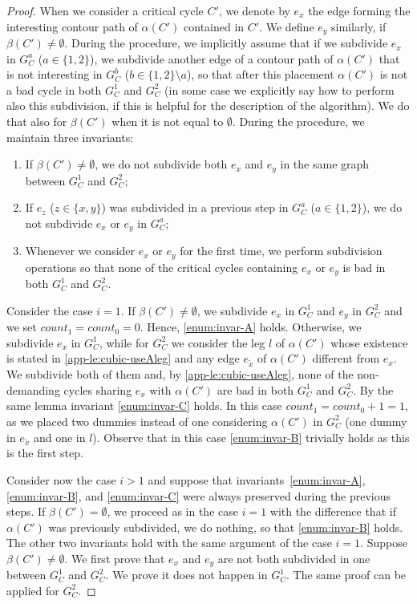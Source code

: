 \documentclass[runningheads]{llncs}
\begin{document}
\begin{proof}
 When we consider a critical cycle $C'$, we denote by $e_x$ the edge forming the interesting contour path of $\alpha(C')$ contained in $C'$. We define $e_y$ similarly, if $\beta(C')\not = \emptyset$. During the procedure, we implicitly assume that if we subdivide $e_x$ in $G^a_C$ ($a\in \{1,2\}$), we subdivide another edge of a contour path of $\alpha(C')$ that is not interesting in $G^b_C$ ($b\in \{1,2\}\setminus a$), so that after this placement $\alpha(C')$ is not a bad cycle in both $G^1_C$ and $G^2_C$ (in some case we explicitly say how to perform also this subdivision, if this is helpful for the description of the algorithm). We do that also for $\beta(C')$ when it is not equal to $\emptyset$. During the procedure, we maintain three invariants:
\begin{enumerate}[({I}1)] 
\item \label{enum:invar-A} 
If $\beta(C')\not = \emptyset$, we do not subdivide both $e_x$ and $e_y$ in the same graph between $G^1_C$ and $G^2_C$;
\item \label{enum:invar-B} 
If $e_z$ ($z\in \{x,y\}$) was subdivided in a previous step in $G^a_C$ ($a\in \{1,2\}$), we do not subdivide $e_x$ or $e_y$ in $G^a_C$;
\item \label{enum:invar-C}
Whenever we consider $e_x$ or $e_y$ for the first time, we perform subdivision operations so that none of the critical cycles containing $e_x$ or $e_y$ is bad in both $G^1_C$ and $G^2_C$.
\end{enumerate}
Consider the case $i=1$. If $\beta(C')\not = \emptyset$, we subdivide $e_x$ in $G^1_C$ and $e_y$ in $G^2_C$ and we set $count_1=count_0=0$. Hence, \ref{enum:invar-A} holds. Otherwise, we subdivide $e_x$ in $G^1_C$, while for $G^2_C$ we consider the leg $l$ of $\alpha(C')$ whose existence is stated in \cref{app-le:cubic-useAleg} and any edge $e_{\tilde x}$ of $\alpha(C')$ different from $e_x$. We subdivide both of them and, by \cref{app-le:cubic-useAleg}, none of the non-demanding cycles sharing $e_x$ with $\alpha(C')$ are bad in both $G^1_C$ and $G^2_C$. By the same lemma invariant  \ref{enum:invar-C} holds. In this case $count_1=count_0+1=1$, as we placed two dummies instead of one considering $\alpha(C')$ in $G^2_C$ (one dummy in $e_{\tilde x}$ and one in $l$). Observe that in this case \ref{enum:invar-B} trivially holds as this is the first step.%

Consider now the case $i>1$ and suppose that invariants~\ref{enum:invar-A}, \ref{enum:invar-B}, and \ref{enum:invar-C} were always preserved during the previous steps. If $\beta(C')= \emptyset$, we proceed as in the case $i=1$ with the difference that if $\alpha(C')$ was previously subdivided, we do nothing, so that \ref{enum:invar-B} holds. The other two invariants hold with the same argument of the case $i=1$. Suppose $\beta(C')\not = \emptyset$. We first prove that $e_x$ and $e_y$ are not both subdivided in one between $G^1_C$ and $G^2_C$. We prove it does not happen in $G^1_C$. The same proof can be applied for $G^2_C$. 


\end{proof}
\end{document}
